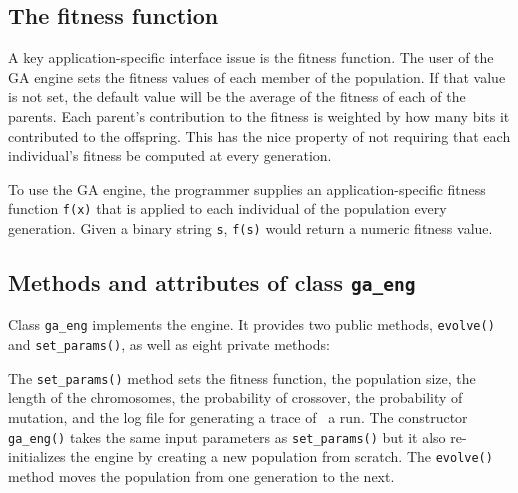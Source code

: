 \subsection*{The fitness function}

A key application-specific interface issue is the fitness function. The
user of the GA engine sets the fitness values of each member of the
population. If that value is not set, the default value will be the
average of the fitness of each of the parents. Each
parent's contribution to the fitness is weighted by
how many bits it contributed to the offspring. This has the nice
property of not requiring that each individual's
fitness be computed at every generation.

To use the GA engine, the programmer supplies an application-specific
fitness function \texttt{f(x)} that is applied to each individual of
the population every generation. Given a binary string \texttt{s},
\texttt{f(s)} would return a numeric fitness value.

\subsection*{Methods and attributes of class \texttt{ga\_eng}}

Class \texttt{ga\_eng} implements the engine. It provides
two public methods, \texttt{evolve()} and \texttt{set\_params()}, as
well as eight private methods: 


The \texttt{set\_params()} method sets the fitness function, the
population size, the length of the chromosomes, the probability of
crossover, the probability of mutation, and the log file for generating
a trace of \ a run. The constructor
\texttt{ga\_eng()} takes the same input parameters as
\texttt{set\_params()} but it also re-initializes the engine by
creating a new population from scratch. The \texttt{evolve()} method
moves the population from one generation to the next.

